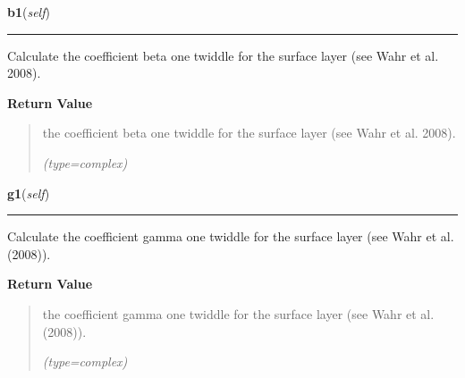     \label{satstress:SatStress:StressDef:b1}

    \vspace{0.5ex}

\hspace{.8\funcindent}\begin{boxedminipage}{\funcwidth}

    \raggedright \textbf{b1}(\textit{self})

    \vspace{-1.5ex}

    \rule{\textwidth}{0.5\fboxrule}
\setlength{\parskip}{2ex}
    Calculate the coefficient beta one twiddle for the surface layer (see 
    Wahr et al. 2008).

\setlength{\parskip}{1ex}
      \textbf{Return Value}
    \vspace{-1ex}

      \begin{quote}
      the coefficient beta one twiddle for the surface layer (see Wahr et 
      al. 2008).

      {\it (type=complex)}

      \end{quote}

    \end{boxedminipage}

    \label{satstress:SatStress:StressDef:g1}

    \vspace{0.5ex}

\hspace{.8\funcindent}\begin{boxedminipage}{\funcwidth}

    \raggedright \textbf{g1}(\textit{self})

    \vspace{-1.5ex}

    \rule{\textwidth}{0.5\fboxrule}
\setlength{\parskip}{2ex}
    Calculate the coefficient gamma one twiddle for the surface layer (see 
    Wahr et al. (2008)).

\setlength{\parskip}{1ex}
      \textbf{Return Value}
    \vspace{-1ex}

      \begin{quote}
      the coefficient gamma one twiddle for the surface layer (see Wahr et 
      al. (2008)).

      {\it (type=complex)}

      \end{quote}

    \end{boxedminipage}


